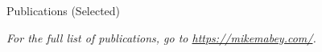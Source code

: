 \documentclass[cvmode=false,font=cantarell,lastname=Mabey]{resume} %
\begin{document}







\begin{rSectionHeading}{Publications (Selected)}
\end{rSectionHeading}
\textit{\footnotesize{For the full list of publications, go to \url{https://mikemabey.com/}.}}
\vspace{-0.5em}



% 



\end{document}
